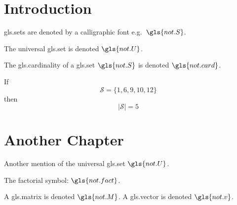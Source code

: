 \documentclass{report}
\newcommand*{\set}[1]{\mathcal{#1}}
\newcommand*{\card}[1]{|#1|}
\begin{document}
\tableofcontents

\chapter{Introduction}

\Glspl{gls.set} are denoted by a calligraphic font
e.g.\ $\gls{not.S}$.

The universal \gls{gls.set} is denoted $\gls{not.U}$.

The \gls{gls.cardinality} of a \gls{gls.set} $\gls{not.S}$ is denoted
$\gls{not.card}$.

If
\[
 \set{S} = \{1, 6, 9, 10, 12\}
\]
then
\[
  \card{\set{S}} = 5
\]

\chapter{Another Chapter}

Another mention of the universal \gls{gls.set} $\gls{not.U}$.

The factorial symbol: $\gls{not.fact}$.

A \gls{gls.matrix} is denoted $\gls{not.M}$.
A \gls{gls.vector} is denoted $\gls{not.v}$.

\printunsrtglossary[title={Summary of Terms}]

\printunsrtglossary[type=symbols,title={Symbols in Order of Use}]

\printunsrtglossary[type=copies,title={Symbols}]
\end{document}
